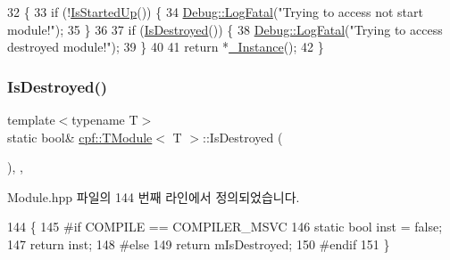 \begin{DoxyCode}
32                              \{
33             \textcolor{keywordflow}{if} (!\hyperlink{classcpf_1_1_t_module_a73732afee7131dad652bf3e00c75cef9}{IsStartedUp}()) \{
34                 \hyperlink{classcpf_1_1_debug_a22849847c74bcb444922c263c9ae6183}{Debug::LogFatal}(\textcolor{stringliteral}{"Trying to access not start module!"});
35             \}
36 
37             \textcolor{keywordflow}{if} (\hyperlink{classcpf_1_1_t_module_a9f70f0a70ac59b13b7a874f82c877337}{IsDestroyed}()) \{
38                 \hyperlink{classcpf_1_1_debug_a22849847c74bcb444922c263c9ae6183}{Debug::LogFatal}(\textcolor{stringliteral}{"Trying to access destroyed module!"});
39             \}
40 
41             \textcolor{keywordflow}{return} *\hyperlink{classcpf_1_1_t_module_a06ab8af8ea6b294959937fd2bbc1e615}{\_Instance}();
42         \}
\end{DoxyCode}
\mbox{\label{classcpf_1_1_t_module_a9f70f0a70ac59b13b7a874f82c877337}} 
\subsubsection{\texorpdfstring{Is\+Destroyed()}{IsDestroyed()}}
{\footnotesize\ttfamily template$<$typename T$>$ \\
static bool\& \hyperlink{classcpf_1_1_t_module}{cpf\+::\+T\+Module}$<$ T $>$\+::Is\+Destroyed (\begin{DoxyParamCaption}{ }\end{DoxyParamCaption})\hspace{0.3cm}{\ttfamily [inline]}, {\ttfamily [static]}, {\ttfamily [private]}}



Module.\+hpp 파일의 144 번째 라인에서 정의되었습니다.


\begin{DoxyCode}
144                                    \{
145 \textcolor{preprocessor}{#if COMPILE == COMPILER\_MSVC }
146             \textcolor{keyword}{static} \textcolor{keywordtype}{bool} inst = \textcolor{keyword}{false};
147             \textcolor{keywordflow}{return} inst;
148 \textcolor{preprocessor}{#else}
149             \textcolor{keywordflow}{return} mIsDestroyed;
150 \textcolor{preprocessor}{#endif}
151         \}
\end{DoxyCode}
\mbox{\label{classcpf_1_1_t_module_acd38943803d522ba6dcf7f0871b2f502}} 
